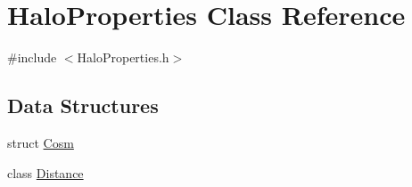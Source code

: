 \section{HaloProperties Class Reference}
\label{classHaloProperties}


{\ttfamily \#include $<$HaloProperties.h$>$}

\subsection*{Data Structures}
\begin{DoxyCompactItemize}
\item 
struct \hyperlink{structHaloProperties_1_1Cosm}{Cosm}
\item 
class \hyperlink{classHaloProperties_1_1Distance}{Distance}
\end{DoxyCompactItemize}
